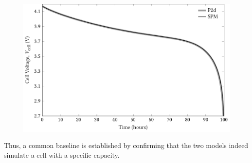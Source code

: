 \begin{figure}[tb]
    \centering
    \includegraphics{4/figures/capacity_match_spm_p2d.pdf}
    \caption{}
\end{figure}








Thus, a common baseline is established  by confirming that the two models indeed
simulate a cell with a specific capacity.

